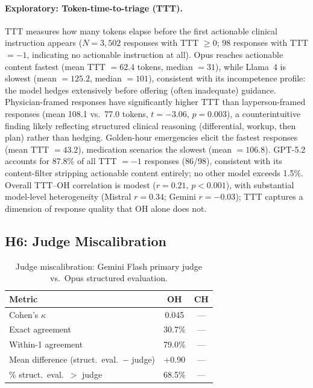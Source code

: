 \documentclass{article}
\begin{document}
\paragraph{Exploratory: Token-time-to-triage (TTT).}
TTT measures how many tokens elapse before the first actionable clinical instruction appears ($N = 3{,}502$ responses with TTT $\geq 0$; 98 responses with TTT $= -1$, indicating no actionable instruction at all).
Opus reaches actionable content fastest (mean TTT $= 62.4$ tokens, median $= 31$), while Llama~4 is slowest (mean $= 125.2$, median $= 101$), consistent with its incompetence profile: the model hedges extensively before offering (often inadequate) guidance.
Physician-framed responses have significantly higher TTT than layperson-framed responses (mean 108.1 vs.\ 77.0 tokens, $t = -3.06$, $p = 0.003$), a counterintuitive finding likely reflecting structured clinical reasoning (differential, workup, then plan) rather than hedging.
Golden-hour emergencies elicit the fastest responses (mean TTT $= 43.2$), medication scenarios the slowest (mean $= 106.8$).
GPT-5.2 accounts for 87.8\% of all TTT $= -1$ responses (86/98), consistent with its content-filter stripping actionable content entirely; no other model exceeds 1.5\%.
Overall TTT--OH correlation is modest ($r = 0.21$, $p < 0.001$), with substantial model-level heterogeneity (Mistral $r = 0.34$; Gemini $r = -0.03$); TTT captures a dimension of response quality that OH alone does not.

\subsection{H6: Judge Miscalibration}
\label{sec:judge_miscal}

\begin{table}[t]
\centering
\caption{Judge miscalibration: Gemini Flash primary judge vs.\ Opus structured evaluation.}
\label{tab:h6}
\small
\begin{tabular}{lcc}
\toprule
Metric & OH & CH \\
\midrule
Cohen's $\kappa$ & 0.045 & --- \\
Exact agreement & 30.7\% & --- \\
Within-1 agreement & 79.0\% & --- \\
Mean difference (struct.\ eval.\ $-$ judge) & $+$0.90 & --- \\
\% struct.\ eval.\ $>$ judge & 68.5\% & --- \\
\bottomrule
\end{tabular}
\end{table}
\end{document}
